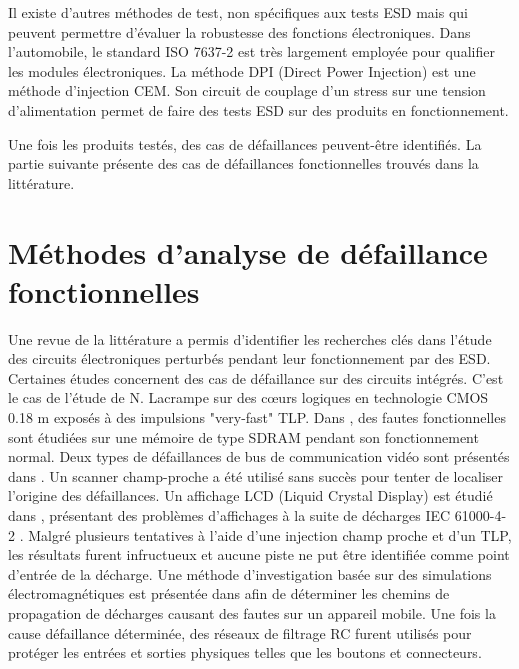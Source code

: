 Il existe d'autres méthodes de test, non spécifiques aux tests ESD mais qui peuvent permettre d'évaluer la robustesse des fonctions électroniques.
Dans l'automobile, le standard ISO 7637-2 est très largement employée pour qualifier les modules électroniques.
La méthode DPI (Direct Power Injection) est une méthode d'injection CEM.
Son circuit de couplage d'un stress sur une tension d'alimentation permet de faire des tests ESD sur des produits en fonctionnement.

Une fois les produits testés, des cas de défaillances peuvent-être identifiés.
La partie suivante présente des cas de défaillances fonctionnelles trouvés dans la littérature.

\section{Méthodes d'analyse de défaillance fonctionnelles}

Une revue de la littérature a permis d'identifier les recherches clés dans l'étude des circuits électroniques perturbés pendant leur fonctionnement par des ESD.
Certaines études concernent des cas de défaillance sur des circuits intégrés.
C'est le cas de l'étude de N. Lacrampe \cite{LacrampeTransientImmunity} sur des cœurs logiques en technologie CMOS 0.18 \textmu{}m exposés à des impulsions "very-fast" TLP.
Dans \cite{SDRAMCase}, des fautes fonctionnelles sont étudiées sur une mémoire de type SDRAM pendant son fonctionnement normal.
Deux types de défaillances de bus de communication vidéo sont présentés dans \cite{softFailSubsystem}.
Un scanner champ-proche a été utilisé sans succès pour tenter de localiser l'origine des défaillances.
Un affichage LCD (Liquid Crystal Display) est étudié dans \cite{softFailLCD}, présentant des problèmes d'affichages à la suite de décharges IEC 61000-4-2 \cite{iec61000-4-2}.
Malgré plusieurs tentatives à l'aide d'une injection champ proche et d'un TLP, les résultats furent infructueux et aucune piste ne put être identifiée comme point d'entrée de la décharge.
Une méthode d'investigation basée sur des simulations électromagnétiques est présentée dans \cite{softFailMobile} afin de déterminer les chemins de propagation de décharges causant des fautes sur un appareil mobile.
Une fois la cause défaillance déterminée, des réseaux de filtrage RC furent utilisés pour protéger les entrées et sorties physiques telles que les boutons et connecteurs.

